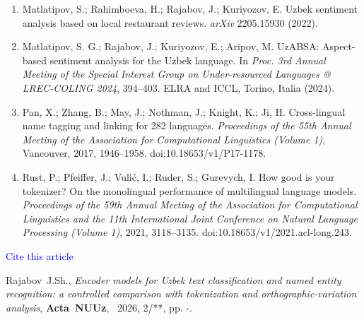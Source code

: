 \documentclass[11pt]{book}
\begin{document}
\begin{enumerate}
\item Matlatipov, S.; Rahimboeva, H.; Rajabov, J.; Kuriyozov, E. Uzbek sentiment analysis based on local restaurant reviews. {\em arXiv} 2205.15930 (2022).

\item Matlatipov, S. G.; Rajabov, J.; Kuriyozov, E.; Aripov, M. UzABSA: Aspect-based sentiment analysis for the Uzbek language. In {\em Proc. 3rd Annual Meeting of the Special Interest Group on Under-resourced Languages @ LREC-COLING 2024}, 394--403. ELRA and ICCL, Torino, Italia (2024).

\item Pan, X.; Zhang, B.; May, J.; Nothman, J.; Knight, K.; Ji, H. Cross-lingual name tagging and linking for 282 languages. {\em Proceedings of the 55th Annual Meeting of the Association for Computational Linguistics (Volume 1)}, Vancouver, 2017, 1946--1958. doi:10.18653/v1/P17-1178.

\item Rust, P.; Pfeiffer, J.; Vuli\'c, I.; Ruder, S.; Gurevych, I. How good is your tokenizer? On the monolingual performance of multilingual language models. {\em Proceedings of the 59th Annual Meeting of the Association for Computational Linguistics and the 11th International Joint Conference on Natural Language Processing (Volume 1)}, 2021, 3118--3135. doi:10.18653/v1/2021.acl-long.243.

\end{enumerate}

\textcolor{blue}{Cite this article}

Rajabov~J.Sh., {\textit{Encoder models for Uzbek text classification and named entity recognition: a controlled comparison with tokenization and orthographic-variation analysis}}, \textbf{Acta~NUUz},~ 2026, 2/**, pp. \pageref{firstpage}-\pageref{lastpage}.

\label{lastpage}
\end{document}
